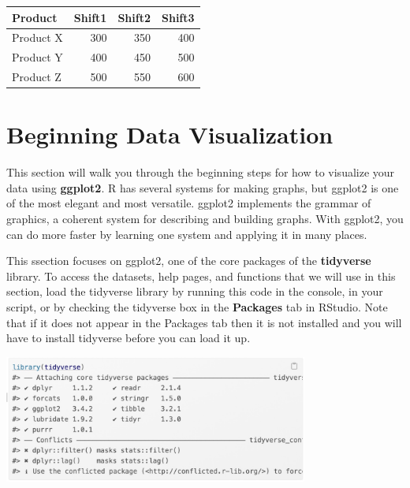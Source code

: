 \documentclass[
  letterpaper,
  DIV=11,
  numbers=noendperiod]{scrreprt}
\begin{document}
\begin{table}
\centering
\begin{tabular}{l|r|r|r}
\hline
Product & Shift1 & Shift2 & Shift3\\
\hline
Product X & 300 & 350 & 400\\
\hline
Product Y & 400 & 450 & 500\\
\hline
Product Z & 500 & 550 & 600\\
\hline
\end{tabular}
\end{table}


\chapter*{Beginning Data
Visualization}\label{beginning-data-visualization}


This section will walk you through the beginning steps for how to
visualize your data using \textbf{ggplot2}. R has several systems for
making graphs, but ggplot2 is one of the most elegant and most
versatile. ggplot2 implements the grammar of graphics, a coherent system
for describing and building graphs. With ggplot2, you can do more faster
by learning one system and applying it in many places.

This ssection focuses on ggplot2, one of the core packages of the
\textbf{tidyverse} library. To access the datasets, help pages, and
functions that we will use in this section, load the tidyverse library
by running this code in the console, in your script, or by checking the
tidyverse box in the \textbf{Packages} tab in RStudio. Note that if it
does not appear in the Packages tab then it is not installed and you
will have to install tidyverse before you can load it up.

\includegraphics[width=0.75\textwidth,height=\textheight]{./images/Daily-2-Pic-1.jpg}
\end{document}
